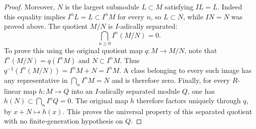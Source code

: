 \begin{proof}
Moreover, $N$ is the largest submodule $L\subset M$ satisfying
$IL=L$. Indeed this equality implies $I^nL=L\subset I^nM$
for every $n$, so $L\subset N$, while $IN=N$ was proved above.
The quotient $M/N$ is $I$-adically separated:
$$
\bigcap_{n\geq0} I^n(M/N)=0.
$$
To prove this using the original quotient map $q:M\to M/N$,
note that $I^n(M/N)=q(I^nM)$ and $N\subset I^nM$.
Thus $q^{-1}(I^n(M/N))=I^nM+N=I^nM$.
A class belonging to every such image has any representative in
$\bigcap_n I^nM=N$ and is therefore zero. Finally, for every
$R$-linear map $h:M\to Q$ into an $I$-adically separated
module $Q$, one has $h(N)\subset\bigcap_n I^nQ=0$.
The original map $h$ therefore factors uniquely through $q$,
by $x+N\mapsto h(x)$. This proves the universal property of
this separated quotient with no finite-generation hypothesis on $Q$.
\end{proof}